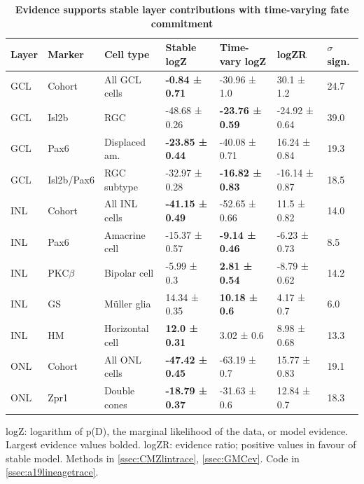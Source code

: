 \documentclass{ut-thesis}
\begin{document}
\begin{NoHyper}
\begin{table}[!ht]
    \caption{{\bf Evidence supports stable layer contributions with time-varying fate commitment}}
    \begin{tabular}{|l|l|l|l|l|l|l|} 
        \hline
        {\bf Layer} & {\bf Marker} & {\bf Cell type} & {\bf Stable logZ} & {\bf Time-vary logZ} & {\bf logZR} & {\bf $\sigma$ sign.}\\ \hline \hline
        GCL & Cohort & All GCL cells & {\bf -0.84 ± 0.71} & -30.96 ± 1.0 & 30.1 ± 1.2 & 24.7\\ \hline \hline
        GCL & Isl2b & RGC & -48.68 ± 0.26 & {\bf -23.76 ± 0.59} & -24.92 ± 0.64 & 39.0\\ \hline
        GCL & Pax6 & Displaced am. & {\bf -23.85 ± 0.44} & -40.08 ± 0.71 & 16.24 ± 0.84 & 19.3\\ \hline
        GCL & Isl2b/Pax6 & RGC subtype & -32.97 ± 0.28 & {\bf -16.82 ± 0.83} & -16.14 ± 0.87 & 18.5\\ \hline \hline
        INL & Cohort & All INL cells & {\bf -41.15 ± 0.49} & -52.65 ± 0.66 & 11.5 ± 0.82 & 14.0\\ \hline \hline
        INL & Pax6 & Amacrine cell & -15.37 ± 0.57 & {\bf -9.14 ± 0.46} & -6.23 ± 0.73 & 8.5\\ \hline
        INL & PKC$\beta$ & Bipolar cell & -5.99 ± 0.3 & {\bf 2.81 ± 0.54} & -8.79 ± 0.62 & 14.2\\ \hline
        INL & GS & M\"{u}ller glia & 14.34 ± 0.35 & {\bf 10.18 ± 0.6} & 4.17 ± 0.7 & 6.0\\ \hline
        INL & HM & Horizontal cell & {\bf 12.0 ± 0.31} &  3.02 ± 0.6 & 8.98 ± 0.68 & 13.3\\ \hline \hline
        ONL & Cohort & All ONL cells & {\bf -47.42 ± 0.45} & -63.19 ± 0.7 & 15.77 ± 0.83 & 19.1\\ \hline \hline
        ONL & Zpr1 & Double cones & {\bf -18.79 ± 0.37} & -31.63 ± 0.6 & 12.84 ± 0.7 & 18.3\\ \hline
    \end{tabular}
    \begin{flushleft}logZ: logarithm of p(D), the marginal likelihood of the data, or model evidence.  Largest evidence values bolded. logZR: evidence ratio; positive values in favour of stable model.
    Methods in \autoref{ssec:CMZlintrace}, \autoref{ssec:GMCev}.
    Code in \autoref{ssec:a19lineagetrace}.    
    \end{flushleft}
    \label{lineage_ev}
\end{table}


\end{NoHyper}
\end{document}
